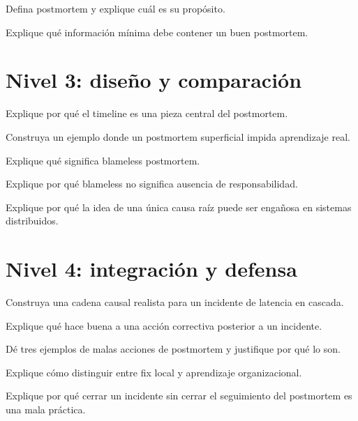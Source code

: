 \documentclass[variant=guia,cover=institutional,mode=screen]{ua-engineering-v6-article}
\begin{document}
\begin{uaexercise}
Defina postmortem y explique cuál es su propósito.
\end{uaexercise}

\begin{uaexercise}
Explique qué información mínima debe contener un buen postmortem.
\end{uaexercise}


\section{Nivel 3: diseño y comparación}
\begin{uaexercise}
Explique por qué el timeline es una pieza central del postmortem.
\end{uaexercise}

\begin{uaexercise}
Construya un ejemplo donde un postmortem superficial impida aprendizaje real.
\end{uaexercise}

\begin{uaexercise}
Explique qué significa blameless postmortem.
\end{uaexercise}

\begin{uaexercise}
Explique por qué blameless no significa ausencia de responsabilidad.
\end{uaexercise}

\begin{uaexercise}
Explique por qué la idea de una única causa raíz puede ser engañosa en sistemas distribuidos.
\end{uaexercise}


\section{Nivel 4: integración y defensa}
\begin{uaexercise}
Construya una cadena causal realista para un incidente de latencia en cascada.
\end{uaexercise}

\begin{uaexercise}
Explique qué hace buena a una acción correctiva posterior a un incidente.
\end{uaexercise}

\begin{uaexercise}
Dé tres ejemplos de malas acciones de postmortem y justifique por qué lo son.
\end{uaexercise}

\begin{uaexercise}
Explique cómo distinguir entre fix local y aprendizaje organizacional.
\end{uaexercise}

\begin{uaexercise}
Explique por qué cerrar un incidente sin cerrar el seguimiento del postmortem es una mala práctica.
\end{uaexercise}
\end{document}
